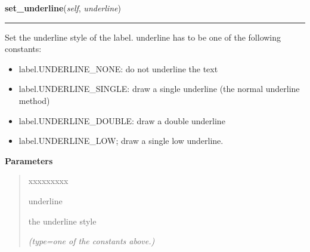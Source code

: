     \vspace{0.5ex}

\hspace{.8\funcindent}\begin{boxedminipage}{\funcwidth}

    \raggedright \textbf{set\_underline}(\textit{self}, \textit{underline})

    \vspace{-1.5ex}

    \rule{\textwidth}{0.5\fboxrule}
\setlength{\parskip}{2ex}
    Set the underline style of the label. underline has to be one of the 
    following constants:

    \begin{itemize}
    \setlength{\parskip}{0.6ex}
      \item label.UNDERLINE\_NONE: do not underline the text

      \item label.UNDERLINE\_SINGLE: draw a single underline (the normal 
        underline method)

      \item label.UNDERLINE\_DOUBLE: draw a double underline

      \item label.UNDERLINE\_LOW; draw a single low underline.

    \end{itemize}

\setlength{\parskip}{1ex}
      \textbf{Parameters}
      \vspace{-1ex}

      \begin{quote}
        \begin{Ventry}{xxxxxxxxx}

          \item[underline]

          the underline style

            {\it (type=one of the constants above.)}

        \end{Ventry}

      \end{quote}

    \end{boxedminipage}

    \label{pygtk_chart:label:Label:get_underline}

